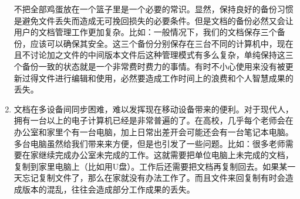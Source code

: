 \begin{enumerate}
不把全部鸡蛋放在一个篮子里是一个必要的常识。显然，保持良好的备份习惯是避免文件丢失而造成无可挽回损失的必要条件。但是文档的备份必然又会让用户的文档管理工作更加复杂。比如：一般情况下，我们的文档保存三个备份，应该可以确保其安全。这三个备份分别保存在三台不同的计算机中，现在且不讨论加之文件的中间版本文件后这种管理模式有多么复杂，单纯保持这三个备份一致的状态就是一个非常费时费力的事情。有时不小心使用来没有被更新过得文件进行编辑和使用，必然要造成工作时间上的浪费和个人智慧成果的丢失。
\item 文档在多设备间同步困难，难以发挥现在移动设备带来的便利。对于现代人，拥有一台以上的电子计算机已经是非常普遍的了。在高校，几乎每个老师会在办公室和家里个有一台电脑，加上日常出差开会可能还会有一台笔记本电脑。多台电脑虽然给我们带来来方便，但是也引发了一些问题。比如：很多老师需要在家继续完成办公室未完成的工作。这就需要把单位电脑上未完成的文档，复制到家里电脑上（比如用U盘）。工作后还需要把文档再复制回去。如果某一天忘记复制文件了，那么在家就没有办法工作了。而且文件来回复制有时会造成版本的混乱，往往会造成部分工作成果的丢失。


\end{enumerate}
